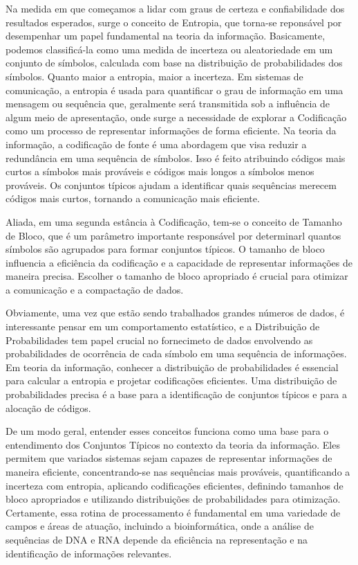 \documentclass{article}
\begin{document}
Na medida em que começamos a lidar com graus de certeza e confiabilidade dos resultados esperados, surge o conceito de Entropia, que torna-se reponsável por desempenhar um papel fundamental na teoria da informação. Basicamente, podemos classificá-la como uma medida de incerteza ou aleatoriedade em um conjunto de símbolos,  calculada com base na distribuição de probabilidades dos símbolos. Quanto maior a entropia, maior a incerteza. Em sistemas de comunicação, a entropia é usada para quantificar o grau de informação em uma mensagem ou sequência que, geralmente será transmitida sob a influência de algum meio de apresentação, onde surge a necessidade de explorar a Codificação como um processo de representar informações de forma eficiente. Na teoria da informação, a codificação de fonte é uma abordagem que visa reduzir a redundância em uma sequência de símbolos. Isso é feito atribuindo códigos mais curtos a símbolos mais prováveis e códigos mais longos a símbolos menos prováveis. Os conjuntos típicos ajudam a identificar quais sequências merecem códigos mais curtos, tornando a comunicação mais eficiente. 

Aliada, em uma segunda estância à Codificação, tem-se o conceito de Tamanho de Bloco, que é um parâmetro importante responsável por determinarl quantos símbolos são agrupados para formar conjuntos típicos. O tamanho de bloco influencia a eficiência da codificação e a capacidade de representar informações de maneira precisa. Escolher o tamanho de bloco apropriado é crucial para otimizar a comunicação e a compactação de dados. 

Obviamente, uma vez que estão sendo trabalhados grandes números de dados, é interessante pensar em um comportamento estatístico, e a Distribuição de Probabilidades tem papel crucial no fornecimeto de dados envolvendo as probabilidades de ocorrência de cada símbolo em uma sequência de informações. Em teoria da informação, conhecer a distribuição de probabilidades é essencial para calcular a entropia e projetar codificações eficientes. Uma distribuição de probabilidades precisa é a base para a identificação de conjuntos típicos e para a alocação de códigos.

De um modo geral, entender esses conceitos funciona como uma base para o entendimento dos Conjuntos Típicos no contexto da teoria da informação. Eles permitem que variados sistemas sejam capazes de representar informações de maneira eficiente, concentrando-se nas sequências mais prováveis, quantificando a incerteza com entropia, aplicando codificações eficientes, definindo tamanhos de bloco apropriados e utilizando distribuições de probabilidades para otimização. Certamente, essa rotina de processamento é fundamental em uma variedade de campos e áreas de atuação, incluindo a bioinformática, onde a análise de sequências de DNA e RNA depende da eficiência na representação e na identificação de informações relevantes.
\end{document}
